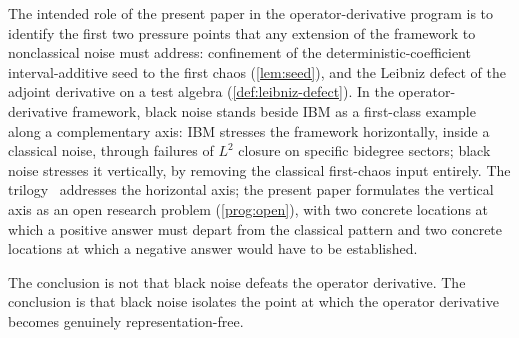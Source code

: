\documentclass[11pt,reqno]{amsart}
\theoremstyle{plain}
\theoremstyle{definition}
\theoremstyle{remark}
\begin{document}
The intended role of the present paper in the operator-derivative
program is to identify the first two pressure points that any
extension of the framework to nonclassical noise must address:
confinement of the deterministic-coefficient interval-additive seed
to the first chaos (\cref{lem:seed}), and the Leibniz defect of the
adjoint derivative on a test algebra (\cref{def:leibniz-defect}). In
the operator-derivative framework, black noise stands beside IBM as
a first-class example along a complementary axis: IBM stresses the
framework horizontally, inside a classical noise, through failures
of $L^2$ closure on specific bidegree sectors; black noise stresses
it vertically, by removing the classical first-chaos input entirely.
The trilogy~\cite{EnergyFirst,FCDC,BidegreeAtlas} addresses the
horizontal axis; the present paper formulates the vertical axis as
an open research problem (\cref{prog:open}), with two concrete
locations at which a positive answer must depart from the classical
pattern and two concrete locations at which a negative answer would
have to be established.

The conclusion is not that black noise defeats the operator
derivative. The conclusion is that black noise isolates the point at
which the operator derivative becomes genuinely representation-free.
\end{document}
